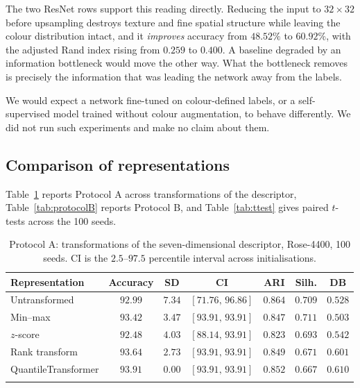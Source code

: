 \documentclass[pdflatex,sn-basic]{sn-jnl}
\theoremstyle{thmstyleone}%
\theoremstyle{thmstyletwo}%
\theoremstyle{thmstylethree}%
\begin{document}
The two ResNet rows support this reading directly. Reducing the input to
$32\times32$ before upsampling destroys texture and fine spatial structure
while leaving the colour distribution intact, and it \emph{improves} accuracy
from $48.52\%$ to $60.92\%$, with the adjusted Rand index rising from $0.259$
to $0.400$. A baseline degraded by an information bottleneck would move the
other way. What the bottleneck removes is precisely the information that was
leading the network away from the labels.

We would expect a network fine-tuned on colour-defined labels, or a
self-supervised model trained without colour augmentation, to behave
differently. We did not run such experiments and make no claim about them.

\subsection{Comparison of representations}\label{sec:rank-eval}

Table~\ref{tab:representations} reports Protocol A across transformations of
the descriptor, Table~\ref{tab:protocolB} reports Protocol B, and
Table~\ref{tab:ttest} gives paired $t$-tests across the 100 seeds.

\begin{table}[h]
\centering
\caption{Protocol A: transformations of the seven-dimensional descriptor,
Rose-4400, 100 seeds. CI is the $2.5$--$97.5$ percentile interval across
initialisations.}\label{tab:representations}
\begin{tabular}{@{}lcccccc@{}}
\toprule
Representation & Accuracy & SD & CI & ARI & Silh. & DB \\
\midrule
Untransformed       & $92.99$ & $7.34$ & $[71.76,\,96.86]$ & $\mathbf{0.864}$ & $0.709$ & $0.528$ \\
Min--max            & $93.42$ & $3.47$ & $[93.91,\,93.91]$ & $0.847$ & $0.711$ & $0.503$ \\
$z$-score           & $92.48$ & $4.03$ & $[88.14,\,93.91]$ & $0.823$ & $0.693$ & $0.542$ \\
Rank transform      & $93.64$ & $2.73$ & $[93.91,\,93.91]$ & $0.849$ & $0.671$ & $0.601$ \\
QuantileTransformer & $93.91$ & $\mathbf{0.00}$ & $[93.91,\,93.91]$ & $0.852$ & $0.667$ & $0.610$ \\
\botrule
\end{tabular}
\end{table}
\end{document}
